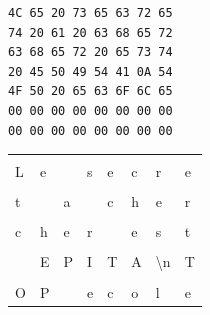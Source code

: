 \documentclass[11pt,a4paper]{article}
\begin{document}
\begin{table}[ht!]
  \centering
  \begin{minipage}{0.4\textwidth}
    \centering
\begin{lstlisting}[style=algorithmique]
4C 65 20 73 65 63 72 65
74 20 61 20 63 68 65 72
63 68 65 72 20 65 73 74
20 45 50 49 54 41 0A 54
4F 50 20 65 63 6F 6C 65
00 00 00 00 00 00 00 00
00 00 00 00 00 00 00 00
\end{lstlisting}
  \end{minipage}
  \hfillx
  \begin{minipage}{0.45\textwidth}
    \centering

%
%
%
%
%
%
%

\begin{tabular}{ | m{0.45cm} | m{0.45cm} | m{0.45cm} | m{0.45cm}   |   m{0.45cm} | m{0.45cm} | m{0.45cm} | m{0.45cm} | }
\hline
   &   &   &   &   &   &   &   \\
 L & e &   & s & e & c & r & e \\
\hline
   &   &   &   &   &   &   &   \\
 t &   & a &   & c & h & e & r \\
\hline
   &   &   &   &   &   &   &   \\
 c & h & e & r &   & e & s & t \\
\hline
   &   &   &   &   &   &                   & \cellcolor{black!15}   \\
   & E & P & I & T & A & \textbackslash{}n & \cellcolor{black!15} T \\
\hline
\cellcolor{black!15}   & \cellcolor{black!15}   & \cellcolor{black!15} & \cellcolor{black!15}   & \cellcolor{black!15}   & \cellcolor{black!15}   & \cellcolor{black!15}   & \cellcolor{black!15}   \\
\cellcolor{black!15} O & \cellcolor{black!15} P & \cellcolor{black!15} & \cellcolor{black!15} e & \cellcolor{black!15} c & \cellcolor{black!15} o & \cellcolor{black!15} l & \cellcolor{black!15} e \\
\hline
\end{tabular}

  \end{minipage}
\end{table}
\end{document}
